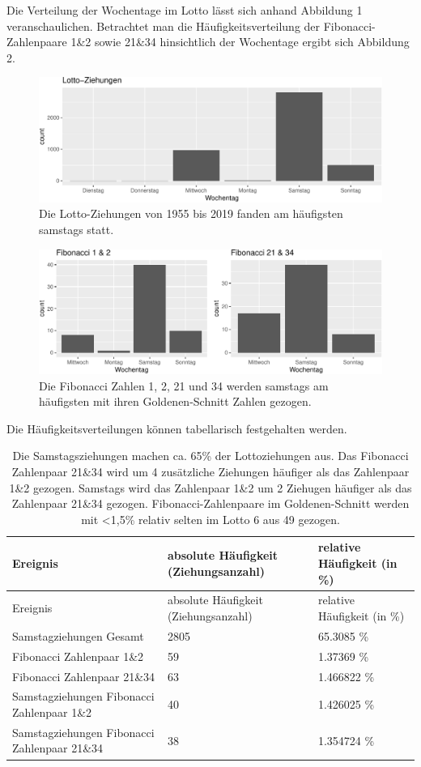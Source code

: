 \documentclass[ngerman,]{article}
\begin{document}
Die Verteilung der Wochentage im Lotto lässt sich anhand Abbildung 1
veranschaulichen. Betrachtet man die Häufigkeitsverteilung der
Fibonacci-Zahlenpaare 1\&2 sowie 21\&34 hinsichtlich der Wochentage
ergibt sich Abbildung 2.

\begin{figure}

\includegraphics{Abbildung/unnamed-chunk-2-1} \hfill{}

\caption{Die Lotto-Ziehungen von 1955 bis 2019 fanden am häufigsten samstags statt.}\label{fig:unnamed-chunk-2}
\end{figure}

\begin{figure}

\includegraphics{Abbildung/unnamed-chunk-3-1} \hfill{}

\caption{Die Fibonacci Zahlen 1, 2, 21 und 34 werden samstags am häufigsten mit ihren Goldenen-Schnitt Zahlen gezogen.}\label{fig:unnamed-chunk-3}
\end{figure}

Die Häufigkeitsverteilungen können tabellarisch festgehalten werden.

\begin{longtable}[]{@{}lll@{}}
\caption{Die Samstagsziehungen machen ca. 65\% der Lottoziehungen aus.
Das Fibonacci Zahlenpaar 21\&34 wird um 4 zusätzliche Ziehungen häufiger
als das Zahlenpaar 1\&2 gezogen. Samstags wird das Zahlenpaar 1\&2 um 2
Ziehugen häufiger als das Zahlenpaar 21\&34 gezogen.
Fibonacci-Zahlenpaare im Goldenen-Schnitt werden mit \textless{}1,5\%
relativ selten im Lotto 6 aus 49 gezogen.}\tabularnewline
\toprule
Ereignis & absolute Häufigkeit (Ziehungsanzahl) & relative Häufigkeit
(in \%)\tabularnewline
\midrule
\endfirsthead
\toprule
Ereignis & absolute Häufigkeit (Ziehungsanzahl) & relative Häufigkeit
(in \%)\tabularnewline
\midrule
\endhead
Samstagziehungen Gesamt & 2805 & 65.3085 \%\tabularnewline
Fibonacci Zahlenpaar 1\&2 & 59 & 1.37369 \%\tabularnewline
Fibonacci Zahlenpaar 21\&34 & 63 & 1.466822 \%\tabularnewline
Samstagziehungen Fibonacci Zahlenpaar 1\&2 & 40 & 1.426025
\%\tabularnewline
Samstagziehungen Fibonacci Zahlenpaar 21\&34 & 38 & 1.354724
\%\tabularnewline
\bottomrule
\end{longtable}
\end{document}
